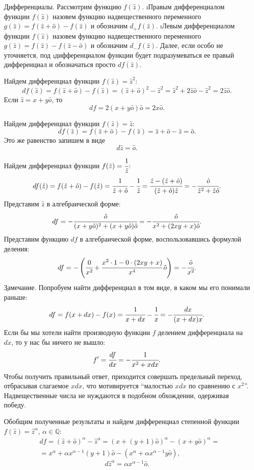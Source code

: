 \b{Дифференциалы.} Рассмотрим функцию $f(\hat{z})$. \i{Правым дифференциалом функции $f(\hat{z})$} назовем функцию надвещественного переменного $g(\hat{z})=f(\hat{z}+\hat{o})-f(\hat{z})$ и обозначим $d_{+}f(\hat{z})$. \i{Левым дифференциалом функции $f(\hat{z})$} назовем функцию надвещественного переменного $g(\hat{z})=f(\hat{z})-f(\hat{z}-\hat{o})$ и обозначим $d_{-}f(\hat{z})$. Далее, если особо не уточняется, под \i{дифференциалом функции} будет подразумеваться ее правый дифференциал и обозначаться просто $df(\hat{z})$.
\begin{example}
	Найдем дифференциал функции $f(\hat{z})=\hat{z}^2$:
		$$df(\hat{z})=f(\hat{z}+\hat{o})-f(\hat{z})=(\hat{z}+\hat{o})^2-\hat{z}^2=\hat{z}^2+2\hat{z}\hat{o}-\hat{z}^2=2\hat{z}\hat{o}.$$
	Если $\hat{z}=x+y\hat{o}$, то
		$$df=2(x+y\hat{o})\hat{o}=2x\hat{o}.$$
\end{example}
\begin{example}
	Найдем дифференциал функции $f(\hat{z})=\hat{z}$:
		$$df(\hat{z})=f(\hat{z}+\hat{o})-f(\hat{z})=\hat{z}+\hat{o}-\hat{z}=\hat{o}.$$
	Это же равенство запишем в виде
		\begin{equation}
			d\hat{z}=\hat{o}.
		\end{equation}
\end{example}
\begin{example}
	Найдем дифференциал функции $f(\hat{z})=\cfrac{1}{\hat{z}}$:
		$$df(\hat{z})=f(\hat{z}+\hat{o})-f(\hat{z})=\cfrac{1}{\hat{z}+\hat{o}}-\cfrac{1}{\hat{z}}=\cfrac{\hat{z}-(\hat{z}+\hat{o})}{(\hat{z}+\hat{o})\hat{z}}=-\cfrac{\hat{o}}{\hat{z}^2+\hat{z}\hat{o}}.$$
	Представим $\hat{z}$ в алгебраической форме:
		$$df=-\cfrac{\hat{o}}{(x+y\hat{o})^2+(x+y\hat{o})\hat{o}}=-\cfrac{\hat{o}}{x^2+(2xy+x)\hat{o}}.$$
	Представим функцию $df$ в алгебраической форме, воспользовавшись формулой деления:
		$$df=-\left(\cfrac{0}{x^2}+\cfrac{x^2\cdot 1-0\cdot(2xy+x)}{x^4}\,\hat{o}\right)=-\cfrac{\hat{o}}{x^2}.$$
	\b{Замечание.} Попробуем найти дифференциал в том виде, в каком мы его понимали раньше:
		$$df=f(x+dx)-f(x)=\cfrac{1}{x+dx}-\cfrac{1}{x}=-\cfrac{dx}{(x+dx)x}.$$
	Если бы мы хотели найти производную функции $f$ делением дифференциала на $dx$, то у нас бы ничего не вышло:
		$$f'=\cfrac{df}{dx}=-\cfrac{1}{x^2+xdx}.$$
	Чтобы получить правильный ответ, приходится совершать предельный переход, отбрасывая слагаемое $xdx$, что мотивируется ``малостью $xdx$ по сравнению с $x^2$''. Надвещественные числа не нуждаются в подобном обхождении, одерживая победу.
\end{example}
\begin{example}
	Обобщим полученные результаты и найдем дифференциал степенной функции $f(\hat{z})=\hat{z}^{\alpha}$, $\alpha\in\mathbb{Q}$:
		\begin{eqnarray*}
			& df=(\hat{z}+\hat{o})^{\alpha}-\hat{z}^{\alpha}=(x+(y+1)\hat{o})^{\alpha}-(x+y\hat{o})^{\alpha}=\\
			& =x^{\alpha}+\alpha x^{\alpha-1}(y+1)\hat{o}-\left(x^{\alpha}+\alpha x^{\alpha-1}y\hat{o}\right),
		\end{eqnarray*}
		\begin{equation}
			d\hat{z}^{\alpha}=\alpha x^{\alpha-1}\hat{o}.
		\end{equation}
\end{example}
